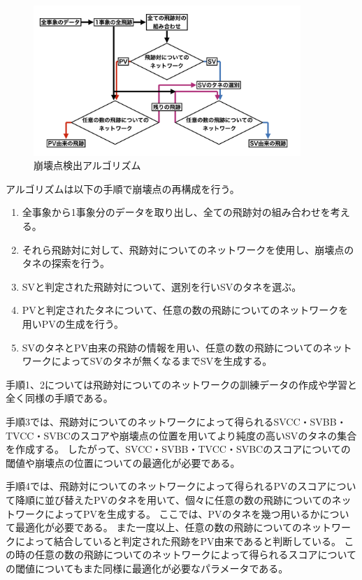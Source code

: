 \begin{figure}[htbp]
 \centering
 \includegraphics[width=0.9\textwidth, clip]{Figure/4VertexFinderwithDL/4-1-0-1VertexFinderAlgorithm.png}
 \caption{崩壊点検出アルゴリズム}
 \label{4-1-0-1VertexFinderAlgorithm}
\end{figure}

アルゴリズムは以下の手順で崩壊点の再構成を行う。

\begin{enumerate}
 \item 全事象から1事象分のデータを取り出し、全ての飛跡対の組み合わせを考える。
 \item それら飛跡対に対して、飛跡対についてのネットワークを使用し、崩壊点のタネの探索を行う。
 \item SVと判定された飛跡対について、選別を行いSVのタネを選ぶ。
 \item PVと判定されたタネについて、任意の数の飛跡についてのネットワークを用いPVの生成を行う。
 \item SVのタネとPV由来の飛跡の情報を用い、任意の数の飛跡についてのネットワークによってSVのタネが無くなるまでSVを生成する。
\end{enumerate}

手順1、2については飛跡対についてのネットワークの訓練データの作成や学習と全く同様の手順である。

手順3では、飛跡対についてのネットワークによって得られるSVCC・SVBB・TVCC・SVBCのスコアや崩壊点の位置を用いてより純度の高いSVのタネの集合を作成する。
したがって、SVCC・SVBB・TVCC・SVBCのスコアについての閾値や崩壊点の位置についての最適化が必要である。

手順4では、飛跡対についてのネットワークによって得られるPVのスコアについて降順に並び替えたPVのタネを用いて、個々に任意の数の飛跡についてのネットワークによってPVを生成する。
ここでは、PVのタネを幾つ用いるかについて最適化が必要である。
また一度以上、任意の数の飛跡についてのネットワークによって結合していると判定された飛跡をPV由来であると判断している。
この時の任意の数の飛跡についてのネットワークによって得られるスコアについての閾値についてもまた同様に最適化が必要なパラメータである。

